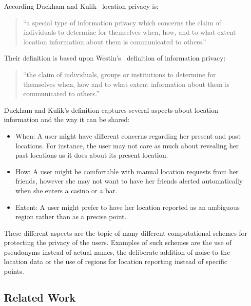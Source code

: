 According Duckham and Kulik~\cite{duckham2006location} location
privacy is:
\begin{quotation}
  ``a special type of information privacy which concerns the claim
  of individuals to determine for themselves when, how, and to what
  extent location information about them is communicated to others.''
\end{quotation}
Their definition is based upon Westin's~\cite{westin1968privacy}
definition of information privacy:
\begin{quotation}
  ``the claim of individuals, groups or institutions to determine for
  themselves when, how and to what extent information about them is
  communicated to others.''
\end{quotation}
Duckham and Kulik's definition captures several aspects about
location information and the way it can be shared:
\begin{itemize}
\item When: A user might have different concerns regarding her present
  and past locations. For instance, the user may not care as much
  about revealing her past locations as it does about its present
  location.
\item How: A user might be comfortable with manual location requests
  from her friends, however she may not want to have her friends
  alerted automatically when she enters a casino or a bar.  
\item Extent: A user might prefer to have her location reported as an
  ambiguous region rather than as a precise point.
\end{itemize}
These different aspects are the topic of many different
computational schemes for protecting the privacy of the users.
Examples of such schemes are the use of pseudonyms instead of actual
names, the deliberate addition of noise to the location data or the use
of regions for location reporting instead of specific points.

\subsection{Related Work}
\label{sec:lp_related_work}


